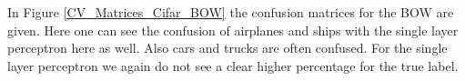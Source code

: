 \documentclass[11pt]{article}
\begin{document}
In Figure \ref{CV_Matrices_Cifar_BOW} the confusion matrices for the BOW are given. Here one can see the confusion of airplanes and ships with the single layer perceptron here as well. Also cars and trucks are often confused. For the single layer perceptron we again do not see a clear higher percentage for the true label. 

\begin{figure}
\centering
{}
\hfill
{}

\end{figure}
\end{document}
